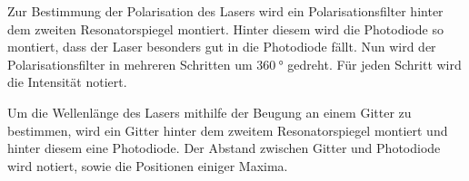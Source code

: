 Zur Bestimmung der Polarisation des Lasers wird ein Polarisationsfilter hinter dem zweiten Resonatorspiegel montiert. Hinter diesem wird die Photodiode so montiert, dass der Laser besonders gut in die Photodiode fällt. Nun wird der Polarisationsfilter in mehreren Schritten um $\SI{360}{\degree}$ gedreht. Für jeden Schritt wird die Intensität notiert.

Um die Wellenlänge des Lasers mithilfe der Beugung an einem Gitter zu bestimmen, wird ein Gitter hinter dem zweitem Resonatorspiegel montiert und hinter diesem eine Photodiode. Der Abstand zwischen Gitter und Photodiode wird notiert, sowie die Positionen einiger Maxima.